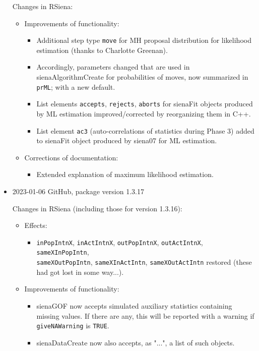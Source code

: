 \documentclass[a4paper,fleqn,11pt]{article}
\newcommand{\+}{\, + \,}
\newcommand{\sfn}[1]{\textsf{#1}}
\begin{document}
\begin{small}
\begin{itemize}
Changes in RSiena:
\begin{itemize}
\item Improvements of functionality:
   \begin{itemize}
  \item Additional step type \texttt{move} for MH proposal distribution
    for likelihood estimation (thanks to Charlotte Greenan).
  \item Accordingly, parameters changed that are used in \textsf{sienaAlgorithmCreate}
   for probabilities of moves, now summarized in \texttt{prML}; with a new default.
  \item List elements \texttt{accepts}, \texttt{rejects}, \texttt{aborts}
    for \sfn{sienaFit} objects
    produced by ML estimation improved/corrected by reorganizing them in C++.
  \item List element \texttt{ac3}
  (auto-correlations of statistics during Phase 3)
    added to  \sfn{sienaFit} object produced by  \textsf{siena07} for ML estimation.
    \end{itemize}
\item Corrections of documentation:
   \begin{itemize}
    \item Extended explanation of maximum likelihood estimation.
    \end{itemize}
\end{itemize}

\item 2023-01-06 GitHub, package version 1.3.17

Changes in \textsf{RSiena} (including those for version 1.3.16):
\begin{itemize}
\item Effects:
    \begin{itemize}
    \item  \texttt{inPopIntnX},  \texttt{inActIntnX},  \texttt{outPopIntnX},
     \texttt{outActIntnX},  \texttt{sameXInPopIntn},\\
     \texttt{sameXOutPopIntn}, \texttt{sameXInActIntn},  \texttt{sameXOutActIntn} restored
    (these had got lost in some way...).
    \end{itemize}
\item Improvements of functionality:
    \begin{itemize}
    \item  \textsf{sienaGOF} now accepts simulated auxiliary statistics containing missing
        values. If there are any, this will be reported with a warning
        if  \texttt{giveNAWarning} is  \texttt{TRUE}.
    \item \textsf{sienaDataCreate} now also accepts, as "...", a list of such objects.
    \end{itemize}
\end{itemize}



\end{itemize}
\end{small}
\end{document}
